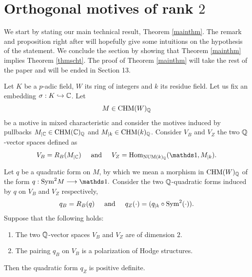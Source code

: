 \documentclass[11pt]{amsart}
\begin{document}
\section{Orthogonal motives of rank $2$}
We start by stating our main technical result,  Theorem \ref{mainthm}. The remark and proposition right after will hopefully give some intuitions on the hypothesis of the statement. We conclude the section by showing that Theorem \ref{mainthm} implies  Theorem \ref{thmscht}. The proof of Theorem \ref{mainthm} will take the rest of the paper and will be ended in Section 13.
\begin{theorem}\label{mainthm}
Let $K$ be a $p$-adic field, $W$  its ring of integers and $k$  its residue field. Let us fix an embedding $\sigma : K \hookrightarrow \mathbb{C}$.
Let \[M \in \mathrm{CHM}(W)_{\mathbb{Q}}\] be a motive in mixed characteristic and consider the motives induced by pullbacks $M_{\vert\mathbb{C}} \in \mathrm{CHM}(\mathbb{C})_{\mathbb{Q}}$ and $M_{\vert{k}} \in \mathrm{CHM}(k)_{\mathbb{Q}}$. Consider $V_B$ and $V_Z$ the two $\mathbb{Q}$-vector spaces defined as
\[V_B = R_B(M_{\vert\C} ) \hspace{0.5cm}
\textrm{and} \hspace{0.5cm}
V_Z = \Hom_{\NUM(k)_\Q}(\one, M_{\vert{k}}).\]

Let $q$ be a quadratic form on $M$, by which we mean a morphism in $ \mathrm{CHM}(W)_{\mathbb{Q}}$  of the form
$q: \Sym^2 M  \longrightarrow \one.$
 Consider the two $\mathbb{Q}$-quadratic forms induced by $q$ on $V_B$ and $V_Z$ respectively, 
\[q_B=R_B(q)  \hspace{0.5cm} \textrm{and}  \hspace{0.5cm} q_Z(\cdot)= (q_{\vert{k}} \circ \textnormal{Sym}^2(\cdot)).\]
Suppose that the following holds:
\begin{enumerate}

\item\label{assumptiondim2} The two $\mathbb{Q}$-vector spaces $V_B$  and $V_Z$ are of dimension $2$.

\item The pairing $q_B$ on $V_B$ is a polarization of Hodge structures.

\end{enumerate}


Then the quadratic form $q_Z$ is positive definite.

\end{theorem}
\end{document}
